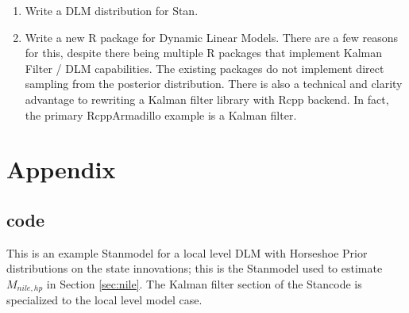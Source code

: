 \documentclass{article}
\newcommand{\Stan}{Stan}
\begin{document}
\begin{enumerate}
\item Write a DLM distribution for Stan.
\item Write a new R package for Dynamic Linear Models. There are a few reasons for this, despite there being multiple R packages that implement Kalman Filter / DLM capabilities. 
The existing packages do not implement direct sampling from the posterior distribution. 
There is also a technical and clarity advantage to rewriting a Kalman filter library with Rcpp backend. In fact, the primary RcppArmadillo example is 
a Kalman filter.
\end{enumerate}

\clearpage{}

\printbibliography{}

\section{Appendix}
\label{sec:appendix
}
\subsection{code}
\label{sec:code}

This is an example \Stan model for a local level DLM with Horseshoe Prior distributions on the state innovations; this is the \Stan model used to estimate $M_{nile,hp}$ in Section \ref{sec:nile}. 
The Kalman filter section of the \Stan code is specialized to the local level model case.

\begin{singlespace}
    
\end{singlespace}
\end{document}
